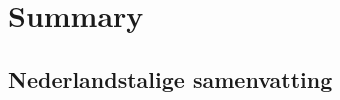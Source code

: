 \documentclass[final,twoside,svgnames]{book}
\begin{document}


\backmatter

\chapter{Summary}


\begin{otherlanguage}{dutch}
\chapter{Nederlandstalige samenvatting}

\end{otherlanguage}




\listoffigures
\listoftables

\clearpage
{}
\printindex
\end{document}
